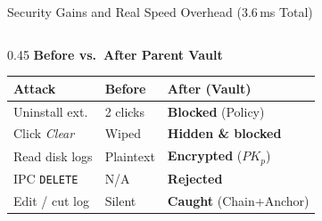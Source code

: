 \documentclass[aspectratio=169,10pt]{beamer}
\begin{document}
\begin{frame}{Security Gains and Real Speed Overhead (3.6\,ms Total)}
  \begin{columns}[c]
    \begin{column}{0.45\textwidth}
      \textbf{\footnotesize\color{snDark}Before vs.\ After Parent Vault}\\[4pt]
      \fontsize{6.8}{8.2}\selectfont
      \renewcommand{\arraystretch}{1.25}
      \begin{tabular}{@{}p{1.95cm} p{1.35cm} p{2.35cm}@{}}
        \toprule
        \textbf{Attack} & \textbf{Before} & \textbf{After (Vault)} \\
        \midrule
        Uninstall ext. & 2 clicks & \textbf{\color{snGreen}Blocked} (Policy) \\
        Click \textit{Clear} & Wiped & \textbf{\color{snGreen}Hidden \& blocked} \\
        Read disk logs & Plaintext & \textbf{\color{snGreen}Encrypted} ($PK_p$) \\
        IPC \texttt{DELETE} & N/A & \textbf{\color{snGreen}Rejected} \\
        Edit / cut log & Silent & \textbf{\color{snGreen}Caught} (Chain+Anchor) \\
        \bottomrule
      \end{tabular}


\end{column}
\end{columns}
\end{frame}
\end{document}

